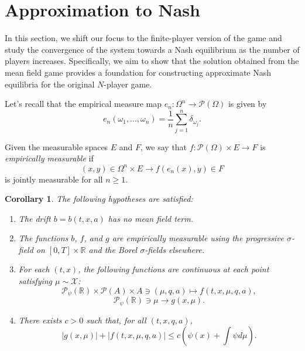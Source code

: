 \documentclass[11pt]{article}
\newtheorem{cor}[thm]{Corollary}
\theoremstyle{definition}
\newtheorem{Def}[thm]{Definition}
\begin{document}
\section{Approximation to Nash}

In this section, we shift our focus to the finite-player version of the game and study the convergence of the system towards a Nash equilibrium as the number of players increases. Specifically, we aim to show that the solution obtained from the mean field game provides a foundation for constructing approximate Nash equilibria for the original $N$-player game. 

Let's recall that the empirical measure map \( e_n : \Omega^n \to \mathcal{P}(\Omega) \) is given by
$$ e_n(\omega_1,...,\omega_n) = \frac{1}{n} \sum_{j=1}^n \delta_{\omega_j}. $$

Given the measurable spaces \( E \) and \( F \), we say that \( f : \mathcal{P}(\Omega) \times E \to F \) is \textit{empirically measurable} if
$$ (x,y) \in \Omega^n \times E \to f(e_n(x),y) \in F $$
is jointly measurable for all \( n \geq 1 \).

\begin{cor}
The following hypotheses are satisfied:
\begin{enumerate}
    \item[\textbf{\hyperref[sup: F.1]{(F.1)}}]
    \label{sup: F.1}
    The drift \( b = b(t,x,a) \) has no mean field term.
    \item[\textbf{\hyperref[sup: F.2]{(F.2)}}]
    \label{sup: F.2}
    The functions \( b \), \( f \), and \( g \) are empirically measurable using the progressive \(\sigma\)-field on \( [0,T] \times \mathbb{R} \) and the Borel \(\sigma\)-fields elsewhere.
    \item[\textbf{\hyperref[sup: F.3]{(F.3)}}]
    \label{sup: F.3}
    For each \( (t,x) \), the following functions are continuous at each point satisfying \( \mu \sim \mathcal{X} \):
    $$ \mathcal{P}_{\psi}(\mathbb{R}) \times \mathcal{P}(A) \times A \ni (\mu,q,a) \mapsto f(t,x,\mu,q,a), $$
    $$ \mathcal{P}_{\psi}(\mathbb{R}) \ni \mu \to g(x,\mu). $$
    \item[\textbf{\hyperref[sup: F.4]{(F.4)}}]
    \label{sup: F.4}
    There exists \( c > 0 \) such that, for all \( (t,x,q,a) \),
    $$ |g(x,\mu)| + |f(t,x,\mu,q,a)| \leq c \left( \psi(x) + \int \psi d\mu \right). $$
\end{enumerate}
\end{cor}
\end{document}

